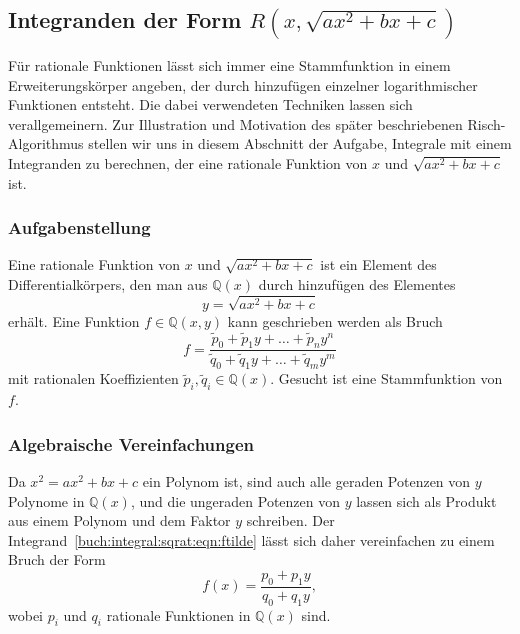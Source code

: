 %
%
%
\subsection{Integranden der Form $R(x,\sqrt{ax^2+bx+c})$
\label{buch:integral:subsection:rxy}}
Für rationale Funktionen lässt sich immer eine Stammfunktion in einem
Erweiterungskörper angeben, der durch hinzufügen einzelner logarithmischer
Funktionen entsteht.
Die dabei verwendeten Techniken lassen sich verallgemeinern.
Zur Illustration und Motivation des später beschriebenen Risch-Algorithmus
stellen wir uns in diesem Abschnitt der Aufgabe, Integrale
mit einem Integranden zu berechnen, der eine rationale Funktion von $x$
und $\sqrt{ax^2+bx+c}$ ist.

%
%
\subsubsection{Aufgabenstellung}
Eine rationale Funktion von $x$ und $\sqrt{ax^2+bx+c}$ ist ein
Element des Differentialkörpers, den man aus $\mathbb{Q}(x)$ durch
hinzufügen des Elementes
\[
y=\sqrt{ax^2+bx+c}
\]
erhält.
Eine Funktion $f\in\mathbb{Q}(x,y)$ kann geschrieben werden als Bruch
\begin{equation}
f
=
\frac{
\tilde{p}_0 + \tilde{p}_1y + \dots + \tilde{p}_n y^n
}{
\tilde{q}_0 + \tilde{q}_1y + \dots + \tilde{q}_m y^m
}
\label{buch:integral:sqrat:eqn:ftilde}
\end{equation}
mit rationalen Koeffizienten $\tilde{p}_i,\tilde{q}_i\in\mathbb{Q}(x)$.
Gesucht ist eine Stammfunktion von $f$.

%
%
\subsubsection{Algebraische Vereinfachungen}
Da $x^2=ax^2+bx+c$ ein Polynom ist, sind auch alle geraden Potenzen
von $y$ Polynome in $\mathbb{Q}(x)$,
und die ungeraden Potenzen von $y$ lassen sich als Produkt aus einem
Polynom und dem Faktor $y$ schreiben.
Der Integrand~\eqref{buch:integral:sqrat:eqn:ftilde} 
lässt sich daher vereinfachen zu einem Bruch der Form
\begin{equation}
f(x)
=
\frac{p_0+p_1y}{q_0+q_1y},
\label{buch:integral:sqrat:eqn:moebius}
\end{equation}
wobei $p_i$ und $q_i$ rationale Funktionen in $\mathbb{Q}(x)$ sind.

%
%
